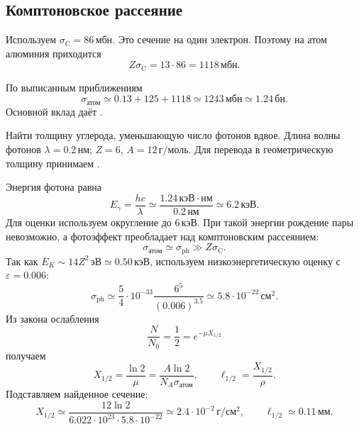 \documentclass[../final.tex]{subfiles}
\begin{document}
\subsection*{Комптоновское рассеяние}

Используем $\sigma_{\mathrm C}=86\,\text{мбн}$.
Это сечение на один электрон. Поэтому на атом алюминия приходится
\begin{equation*}
    Z\sigma_{\mathrm C}=13\cdot86=1118\,\text{мбн}.
\end{equation*}

\answer
По выписанным приближениям
\begin{equation*}
    \sigma_{\text{атом}}\simeq0.13+125+1118
    \simeq1243\,\text{мбн}\simeq1.24\,\text{бн}.
\end{equation*}
Основной вклад даёт
.

\label{task:carbon_half_layer_sem4}

\condition
Найти толщину углерода, уменьшающую число фотонов вдвое.
Длина волны фотонов $\lambda=0.2\,\text{нм}$;
$Z=6$, $A=12\,\text{г}/\text{моль}$.
Для перевода в геометрическую толщину принимаем
.

\solution
Энергия фотона равна
\begin{equation*}
    E_\gamma=\frac{hc}{\lambda}
    \simeq\frac{1.24\,\text{кэВ}\cdot\text{нм}}{0.2\,\text{нм}}
    \simeq6.2\,\text{кэВ}.
\end{equation*}
Для оценки используем округление до $6\,\text{кэВ}$.
При такой энергии рождение пары невозможно, а фотоэффект преобладает
над комптоновским рассеянием:
\begin{equation*}
    \sigma_{\text{атом}}\simeq\sigma_{\mathrm{ph}}
    \gg Z\sigma_{\mathrm C}.
\end{equation*}
Так как $E_K\sim14Z^2\,\text{эВ}\simeq0.50\,\text{кэВ}$,
используем низкоэнергетическую оценку с $\varepsilon=0.006$:
\begin{equation*}
    \sigma_{\mathrm{ph}}\simeq
    \frac54\cdot10^{-33}\frac{6^5}{(0.006)^{3.5}}
    \simeq5.8\cdot10^{-22}\,\text{см}^2.
\end{equation*}
Из закона ослабления
\begin{equation*}
    \frac{N}{N_0}=\frac12=e^{-\mu X_{1/2}}
\end{equation*}
получаем
\begin{equation*}
    X_{1/2}=\frac{\ln2}{\mu}
    =\frac{A\ln2}{N_A\sigma_{\text{атом}}},\qquad
    \ell_{1/2}=\frac{X_{1/2}}{\rho}.
\end{equation*}
Подставляем найденное сечение:
\begin{equation*}
    X_{1/2}\simeq
    \frac{12\ln2}{6.022\cdot10^{23}\cdot5.8\cdot10^{-22}}
    \simeq2.4\cdot10^{-2}\,\text{г}/\text{см}^2,
    \qquad
    \ell_{1/2}\simeq0.11\,\text{мм}.
\end{equation*}
\end{document}
